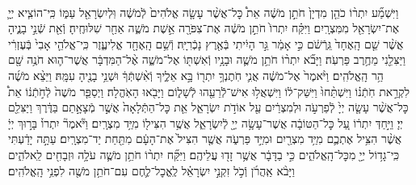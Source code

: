 \documentclass[twoside, openany, parskip=half, 11pt]{book}
\begin{document}
\begin{footnotesize}
\begin{multicols}{2}
\\
וַיִּשְׁמַ֞ע יִתְר֨וֹ כֹהֵ֤ן מִדְיָן֙ חֹתֵ֣ן מֹשֶׁ֔ה אֵת֩ כׇּל־אֲשֶׁ֨ר עָשָׂ֤ה אֱלֹהִים֙ לְֿמֹשֶׁ֔ה וּֽלְיִשְׂרָאֵ֖ל עַמּ֑וֹ כִּֽי־הוֹצִ֧יא יְיָ֛ אֶת־יִשְׂרָאֵ֖ל מִמִּצְרָֽיִם׃ וַיִּקַּ֗ח יִתְרוֹ֙ חֹתֵ֣ן מֹשֶׁ֔ה אֶת־צִפֹּרָ֖ה אֵ֣שֶׁת מֹשֶׁ֑ה אַחַ֖ר שִׁלּוּחֶֽיהָ׃ וְֿאֵ֖ת שְֿׁנֵ֣י בָנֶ֑יהָ אֲשֶׁ֨ר שֵׁ֤ם הָֽאֶחָד֙ גֵּֽרְֿשֹׁ֔ם כִּ֣י אָמַ֔ר גֵּ֣ר הָיִ֔יתִי בְּֿאֶ֖רֶץ נָכְֿרִיָּֽה׃ וְֿשֵׁ֥ם הָֽאֶחָ֖ד אֱלִיעֶ֑זֶר כִּֽי־אֱלֹהֵ֤י אָבִי֙ בְּֿעֶזְרִ֔י וַיַּצִּלֵ֖נִי מֵחֶ֥רֶב פַּרְעֹֽה׃  וַיָּבֹ֞א יִתְר֨וֹ חֹתֵ֥ן מֹשֶׁ֛ה וּבָנָ֥יו וְֿאִשְׁתּ֖וֹ אֶל־מֹשֶׁ֑ה אֶ֨ל־הַמִּדְבָּ֔ר אֲשֶׁר־ה֛וּא חֹנֶ֥ה שָׁ֖ם הַ֥ר הָֽאֱלֹהִֽים׃ וַיֹּ֨אמֶר֙ אֶל־מֹשֶׁ֔ה אֲנִ֛י חֹֽתֶנְךָ֥ יִתְר֖וֹ בָּ֣א אֵלֶ֑יךָ וְֿאִ֨שְׁתְּֿךָ֔ וּשְׁנֵ֥י בָנֶ֖יהָ עִמָּֽהּ׃ וַיֵּצֵ֨א מֹשֶׁ֜ה לִקְרַ֣את חֹֽתְֿנ֗וֹ וַיִּשְׁתַּ֨חוּ֙ וַיִּשַּׁק־ל֔וֹ וַיִּשְׁאֲל֥וּ אִישׁ־לְֿֿרֵעֵ֖הוּ לְֿשָׁל֑וֹם וַיָּבֹ֖אוּ הָאֹֽהֱלָה׃ וַיְסַפֵּ֤ר מֹשֶׁה֙ לְֿחֹ֣תְֿנ֔וֹ אֵת֩ כׇּל־אֲשֶׁ֨ר עָשָׂ֤ה יְיָ֙ לְֿפַרְעֹ֣ה וּלְמִצְרַ֔יִם עַ֖ל אוֹדֹ֣ת יִשְׂרָאֵ֑ל אֵ֤ת כׇּל־הַתְּֿלָאָה֙ אֲשֶׁ֣ר מְֿצָאָ֣תַם בַּדֶּ֔רֶךְ וַיַּצִּלֵ֖ם יְיָ׃  וַיִּ֣חַדְּ יִתְר֔וֹ עַ֚ל כׇּל־הַטּוֹבָ֔ה אֲשֶׁר־עָשָׂ֥ה יְיָ֖ לְֿיִשְׂרָאֵ֑ל אֲשֶׁ֥ר הִצִּיל֖וֹ מִיַּ֥ד מִצְרָֽיִם׃ וַיֹּ֘אמֶר֘ יִתְרוֹ֒ בָּר֣וּךְ יְיָ֔ אֲשֶׁ֨ר הִצִּ֥יל אֶתְכֶ֛ם מִיַּ֥ד מִצְרַ֖יִם וּמִיַּ֣ד פַּרְעֹ֑ה אֲשֶׁ֤ר הִצִּיל֙ אֶת־הָעָ֔ם מִתַּ֖חַת יַד־מִצְרָֽיִם׃ עַתָּ֣ה יָדַ֔עְתִּי כִּֽי־גָד֥וֹל יְיָ֖ מִכׇּל־הָֽאֱלֹהִ֑ים כִּ֣י בַדָּבָ֔ר אֲשֶׁ֥ר זָד֖וּ עֲלֵיהֶֽם׃ וַיִּקַּ֞ח יִתְר֨וֹ חֹתֵ֥ן מֹשֶׁ֛ה עֹלָ֥ה וּזְבָחִ֖ים לֵֽאלֹהִ֑ים וַיָּבֹ֨א אַֽהֲרֹ֜ן וְֿכֹ֣ל זִקְנֵ֣י יִשְׂרָאֵ֗ל לֶֽאֱכׇל־לֶ֛חֶם עִם־חֹתֵ֥ן מֹשֶׁ֖ה לִפְנֵ֥י הָֽאֱלֹהִֽים׃


\end{multicols}
\end{footnotesize}
\end{document}
